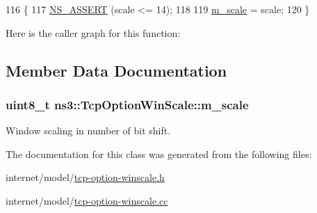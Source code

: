 \begin{DoxyCode}
116 \{
117   \hyperlink{assert_8h_a6dccdb0de9b252f60088ce281c49d052}{NS\_ASSERT} (scale <= 14);
118 
119   \hyperlink{classns3_1_1TcpOptionWinScale_aaf309f353a9be35cc3aead34876340d0}{m\_scale} = scale;
120 \}
\end{DoxyCode}


Here is the caller graph for this function\+:




\subsection{Member Data Documentation}
\subsubsection[{\texorpdfstring{m\+\_\+scale}{m_scale}}]{\setlength{\rightskip}{0pt plus 5cm}uint8\+\_\+t ns3\+::\+Tcp\+Option\+Win\+Scale\+::m\+\_\+scale\hspace{0.3cm}{\ttfamily [protected]}}\hypertarget{classns3_1_1TcpOptionWinScale_aaf309f353a9be35cc3aead34876340d0}{}\label{classns3_1_1TcpOptionWinScale_aaf309f353a9be35cc3aead34876340d0}


Window scaling in number of bit shift. 



The documentation for this class was generated from the following files\+:\begin{DoxyCompactItemize}
\item 
internet/model/\hyperlink{tcp-option-winscale_8h}{tcp-\/option-\/winscale.\+h}\item 
internet/model/\hyperlink{tcp-option-winscale_8cc}{tcp-\/option-\/winscale.\+cc}\end{DoxyCompactItemize}

